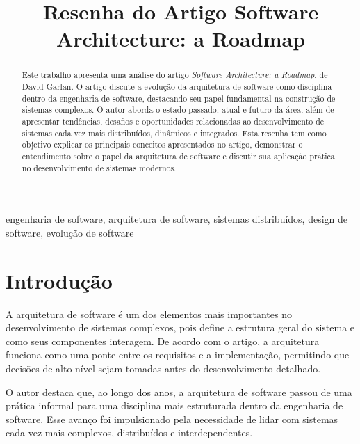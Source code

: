 \documentclass[conference]{IEEEtran}
\begin{document}
\title{Resenha do Artigo Software Architecture: a Roadmap}

\author{
}

\maketitle

\begin{abstract}

Este trabalho apresenta uma análise do artigo \textit{Software Architecture: a Roadmap}, de David Garlan. O artigo discute a evolução da arquitetura de software como disciplina dentro da engenharia de software, destacando seu papel fundamental na construção de sistemas complexos. O autor aborda o estado passado, atual e futuro da área, além de apresentar tendências, desafios e oportunidades relacionadas ao desenvolvimento de sistemas cada vez mais distribuídos, dinâmicos e integrados. Esta resenha tem como objetivo explicar os principais conceitos apresentados no artigo, demonstrar o entendimento sobre o papel da arquitetura de software e discutir sua aplicação prática no desenvolvimento de sistemas modernos.

\end{abstract}

\begin{IEEEkeywords}
engenharia de software, arquitetura de software, sistemas distribuídos, design de software, evolução de software
\end{IEEEkeywords}

\section{Introdução}

A arquitetura de software é um dos elementos mais importantes no desenvolvimento de sistemas complexos, pois define a estrutura geral do sistema e como seus componentes interagem. De acordo com o artigo, a arquitetura funciona como uma ponte entre os requisitos e a implementação, permitindo que decisões de alto nível sejam tomadas antes do desenvolvimento detalhado.

O autor destaca que, ao longo dos anos, a arquitetura de software passou de uma prática informal para uma disciplina mais estruturada dentro da engenharia de software. Esse avanço foi impulsionado pela necessidade de lidar com sistemas cada vez mais complexos, distribuídos e interdependentes.
\end{document}

